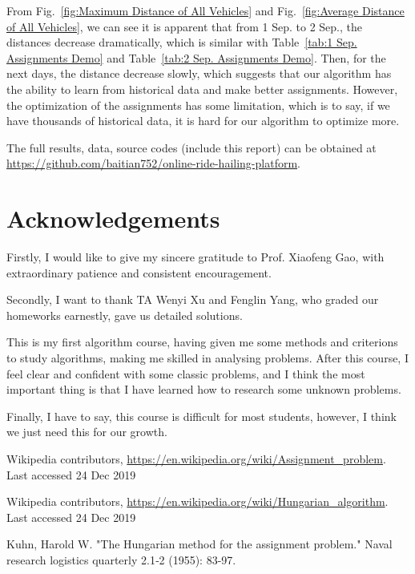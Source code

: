 \documentclass{llncs}
\begin{document}
From Fig.~\ref{fig:Maximum Distance of All Vehicles} and Fig.~\ref{fig:Average Distance of All Vehicles}, we can see it is apparent that from 1 Sep. to 2 Sep., the distances decrease dramatically, which is similar with Table~\ref{tab:1 Sep. Assignments Demo} and Table~\ref{tab:2 Sep. Assignments Demo}. Then, for the next days, the distance decrease slowly, which suggests that our algorithm has the ability to learn from historical data and make better assignments. However, the optimization of the assignments has some limitation, which is to say, if we have thousands of historical data, it is hard for our algorithm to optimize more.

\quad\newline
\quad\newline
\quad\newline
The full results, data, source codes (include this report) can be obtained at \url{https://github.com/baitian752/online-ride-hailing-platform}.


\section*{Acknowledgements}

Firstly, I would like to give my sincere gratitude to Prof. Xiaofeng Gao, with extraordinary patience and consistent encouragement.

Secondly, I want to thank TA Wenyi Xu and Fenglin Yang, who graded our homeworks earnestly, gave us detailed solutions.

This is my first algorithm course, having given me some methods and criterions to study algorithms, making me skilled in analysing problems. After this course, I feel clear and confident with some classic problems, and I think the most important thing is that I have learned how to research some unknown problems.

Finally, I have to say, this course is difficult for most students, however, I think we just need this for our growth.

\begin{thebibliography}{9}
Wikipedia contributors, \url{https://en.wikipedia.org/wiki/Assignment_problem}. Last accessed 24 Dec 2019

Wikipedia contributors, \url{https://en.wikipedia.org/wiki/Hungarian_algorithm}. Last accessed 24 Dec 2019

Kuhn, Harold W. "The Hungarian method for the assignment problem." Naval research logistics quarterly 2.1‐2 (1955): 83-97.

\end{thebibliography}
\end{document}
